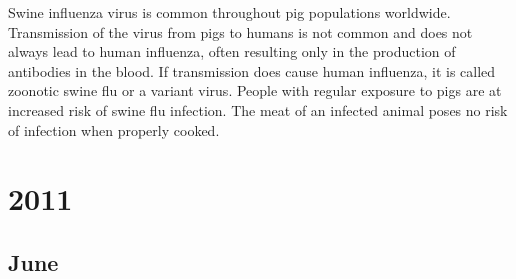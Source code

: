 \documentclass[11pt]{report}
\begin{document}
Swine influenza virus is common throughout pig populations worldwide. Transmission of the virus from pigs to humans is not common and does not always lead to human influenza, often resulting only in the production of antibodies in the blood. If transmission does cause human influenza, it is called zoonotic swine flu or a variant virus. People with regular exposure to pigs are at increased risk of swine flu infection. The meat of an infected animal poses no risk of infection when properly cooked.

\chapter{2011}

\section{June}
\end{document}
